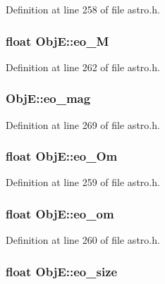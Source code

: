 Definition at line 258 of file astro.\-h.

\hypertarget{struct_obj_e_abf1b3b9093196f05339af6b2c103b452}{
\subsubsection[{eo\-\_\-\-M}]{\setlength{\rightskip}{0pt plus 5cm}float Obj\-E\-::eo\-\_\-\-M}}\label{struct_obj_e_abf1b3b9093196f05339af6b2c103b452}


Definition at line 262 of file astro.\-h.

\hypertarget{struct_obj_e_af226a2ba02b4f5af8848bbcf601272bc}{
\subsubsection[{eo\-\_\-mag}]{ Obj\-E\-::eo\-\_\-mag}}\label{struct_obj_e_af226a2ba02b4f5af8848bbcf601272bc}


Definition at line 269 of file astro.\-h.

\hypertarget{struct_obj_e_a705d0e32e827fb82f140f44259192a1d}{
\subsubsection[{eo\-\_\-\-Om}]{\setlength{\rightskip}{0pt plus 5cm}float Obj\-E\-::eo\-\_\-\-Om}}\label{struct_obj_e_a705d0e32e827fb82f140f44259192a1d}


Definition at line 259 of file astro.\-h.

\hypertarget{struct_obj_e_a141d2d2f867c980b6659d2107929503a}{
\subsubsection[{eo\-\_\-om}]{\setlength{\rightskip}{0pt plus 5cm}float Obj\-E\-::eo\-\_\-om}}\label{struct_obj_e_a141d2d2f867c980b6659d2107929503a}


Definition at line 260 of file astro.\-h.

\hypertarget{struct_obj_e_aa2b3a65ada0f743f8b09ef8794298fe7}{
\subsubsection[{eo\-\_\-size}]{\setlength{\rightskip}{0pt plus 5cm}float Obj\-E\-::eo\-\_\-size}}\label{struct_obj_e_aa2b3a65ada0f743f8b09ef8794298fe7}


